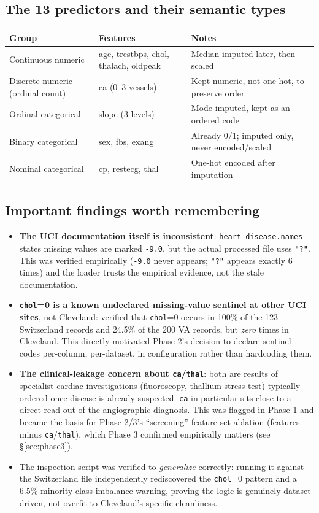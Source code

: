 \documentclass[11pt,a4paper]{article}
\newcommand{\code}[1]{\texttt{\small #1}}
\begin{document}
\subsection{The 13 predictors and their semantic types}
\begin{tabularx}{\textwidth}{@{}p{3.5cm}p{3.6cm}Y@{}}
\toprule
\textbf{Group} & \textbf{Features} & \textbf{Notes} \\
\midrule
Continuous numeric & age, trestbps, chol, thalach, oldpeak & Median-imputed later, then scaled \\
Discrete numeric (ordinal count) & ca (0--3 vessels) & Kept numeric, not one-hot, to preserve order \\
Ordinal categorical & slope (3 levels) & Mode-imputed, kept as an ordered code \\
Binary categorical & sex, fbs, exang & Already 0/1; imputed only, never encoded/scaled \\
Nominal categorical & cp, restecg, thal & One-hot encoded after imputation \\
\bottomrule
\end{tabularx}

\subsection{Important findings worth remembering}
\begin{itemize}[leftmargin=1.4em]
  \item \textbf{The UCI documentation itself is inconsistent}: \code{heart-disease.names} states missing values are marked \code{-9.0}, but the actual processed file uses \code{"?"}. This was verified empirically (\code{-9.0} never appears; \code{"?"} appears exactly 6 times) and the loader trusts the empirical evidence, not the stale documentation.
  \item \textbf{\code{chol}=0 is a known undeclared missing-value sentinel at other UCI sites}, not Cleveland: verified that \code{chol}=0 occurs in 100\% of the 123 Switzerland records and 24.5\% of the 200 VA records, but \emph{zero} times in Cleveland. This directly motivated Phase 2's decision to declare sentinel codes per-column, per-dataset, in configuration rather than hardcoding them.
  \item \textbf{The clinical-leakage concern about \code{ca}/\code{thal}}: both are results of specialist cardiac investigations (fluoroscopy, thallium stress test) typically ordered once disease is already suspected. \code{ca} in particular sits close to a direct read-out of the angiographic diagnosis. This was flagged in Phase 1 and became the basis for Phase 2/3's ``screening'' feature-set ablation (features minus \code{ca}/\code{thal}), which Phase 3 confirmed empirically matters (see \S\ref{sec:phase3}).
  \item The inspection script was verified to \emph{generalize} correctly: running it against the Switzerland file independently rediscovered the \code{chol}=0 pattern and a 6.5\% minority-class imbalance warning, proving the logic is genuinely dataset-driven, not overfit to Cleveland's specific cleanliness.
\end{itemize}
\end{document}
